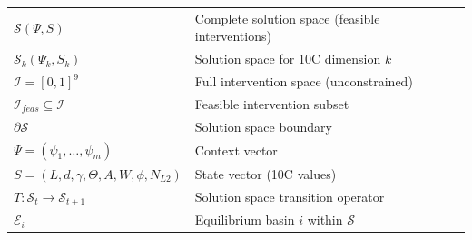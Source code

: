\begin{abstract}
This appendix formalizes the \textbf{Solution Space} $\mathcal{S}(\Psi, S)$ -- the set of feasible interventions given context $\Psi$ and state $S$. While Appendix MP defines WHAT we optimize (objective function $P_{eff}$), this appendix defines WHERE we can optimize (the feasible region). The solution space is not fixed but \textbf{endogenously determined} by context and dynamically evolves as behavior changes context. We formalize: (1) Solution space per 10C dimension, (2) Context-dependent boundaries, (3) Intervention-induced space evolution, (4) The EMERGE algorithm as solution space generator, and (5) Multi-equilibria navigation within constrained spaces. This completes the formal optimization framework by specifying the constraint set referenced in MP's Bellman formulation.
\end{abstract}

\begin{tcolorbox}[colback=blue!5!white, colframe=blue!75!black, title=Quick Reference: Solution Space Notation]
\begin{tabular}{ll}
$\mathcal{S}(\Psi, S)$ & Complete solution space (feasible interventions) \\
$\mathcal{S}_k(\Psi_k, S_k)$ & Solution space for 10C dimension $k$ \\
$\mathcal{I} = [0,1]^9$ & Full intervention space (unconstrained) \\
$\mathcal{I}_{feas} \subseteq \mathcal{I}$ & Feasible intervention subset \\
$\partial \mathcal{S}$ & Solution space boundary \\
$\Psi = (\psi_1, \ldots, \psi_m)$ & Context vector \\
$S = (L, d, \gamma, \Theta, A, W, \phi, N_{L2})$ & State vector (10C values) \\
$T: \mathcal{S}_t \to \mathcal{S}_{t+1}$ & Solution space transition operator \\
$\mathcal{E}_i$ & Equilibrium basin $i$ within $\mathcal{S}$ \\
\end{tabular}
\end{tcolorbox}

